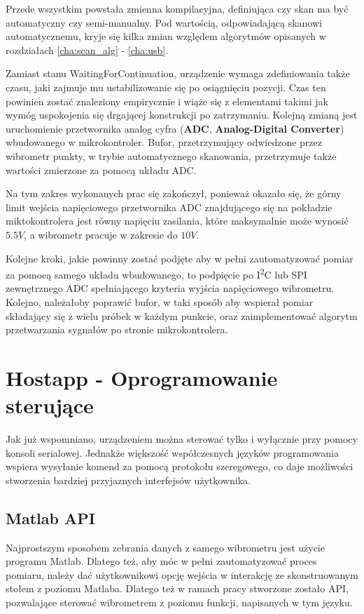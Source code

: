 Przede wszystkim powstała zmienna kompilacyjna, definiująca czy skan ma być automatyczny czy semi-manualny. Pod wartością, odpowiadającą skanowi automatycznemu, kryje się kilka zmian względem algorytmów opisanych w rozdziałach \ref{cha:scan_alg} - \ref{cha:usb}.

Zamiast stanu WaitingForContinuation, urządzenie wymaga zdefiniowania także czasu, jaki zajmuje mu ustabilizowanie się po osiągnięciu pozycji. Czas ten powinien zostać znaleziony empirycznie i wiąże się z elementami takimi jak wymóg uspokojenia się drgającej konstrukcji po zatrzymaniu. Kolejną zmianą jest uruchomienie przetwornika analog cyfra (\textbf{ADC}, \textbf{Analog-Digital Converter}) wbudowanego w mikrokontroler. Bufor, przetrzymujący odwiedzone przez wibrometr punkty, w trybie automatycznego skanowania, przetrzymuje także wartości zmierzone za pomocą układu ADC.

Na tym zakres wykonanych prac się zakończył, ponieważ okazało się, że górny limit wejścia napięciowego przetwornika ADC znajdującego się na pokładzie miktokontrolera jest równy napięciu zasilania, które maksymalnie może wynosić $5.5V$, a wibrometr pracuje w zakresie do $10V$.

Kolejne kroki, jakie powinny zostać podjęte aby w pełni zautomatyzować pomiar za pomocą samego układu wbudowanego, to podpięcie po I\textsuperscript{2}C lub SPI zewnętrznego ADC spełniającego kryteria wyjścia napięciowego wibrometru. Kolejno, należałoby poprawić bufor, w taki sposób aby wspierał pomiar składający się z wielu próbek w każdym punkcie, oraz zaimplementować algorytm przetwarzania sygnałów po stronie mikrokontrolera.

\section{Hostapp - Oprogramowanie sterujące}
\label{cha:host_apps}
Jak już wspomniano, urządzeniem można sterować tylko i wyłącznie przy pomocy konsoli serialowej. Jednakże większość współczesnych języków programowania wspiera wysyłanie komend za pomocą protokołu szeregowego, co daje możliwości stworzenia bardziej przyjaznych interfejsów użytkownika.

\subsection{Matlab API}
\label{cha:matlab_api}
Najprostszym sposobem zebrania danych z samego wibrometru jest użycie programu Matlab. Dlatego też, aby móc w pełni zautomatyzować proces pomiaru, należy dać użytkownikowi opcję wejścia w interakcję ze skonstruowanym stołem z poziomu Matlaba. Dlatego też w ramach pracy stworzone zostało API, pozwalające sterować wibrometrem z poziomu funkcji, napisanych w tym języku.

